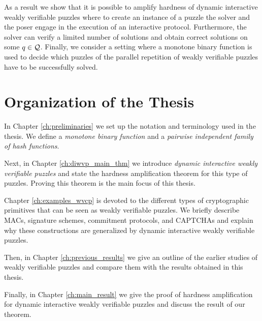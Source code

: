 As a result we show that it is possible to amplify hardness of dynamic interactive weakly verifiable puzzles where
to create an instance of a puzzle the solver and the poser engage in the execution of an interactive protocol.
Furthermore, the solver can verify a limited number of solutions and obtain correct solutions on some $q \in \mathcal{Q}$.
Finally, we consider a setting where a monotone binary function is used to decide which puzzles of the parallel repetition of weakly verifiable puzzles
have to be successfully solved.
%
\section{Organization of the Thesis}
In Chapter \ref{ch:preliminaries} we set up the notation and terminology used in the thesis.
We define a \textit{monotone binary function} and a \textit{pairwise independent family of hash functions}.

Next, in Chapter \ref{ch:diwvp_main_thm} we introduce \textit{dynamic interactive weakly verifiable
puzzles} and state the hardness amplification theorem for this type of puzzles.
Proving this theorem is the main focus of this thesis.

Chapter \ref{ch:examples_wvcp} is devoted to the different types of cryptographic primitives that
can be seen as weakly verifiable puzzles.
We briefly describe MACs, signature schemes, commitment protocols, and CAPTCHAs and explain why
these constructions are generalized by dynamic interactive weakly verifiable puzzles.

Then, in Chapter \ref{ch:previous_results} we give an outline of the earlier studies of weakly
verifiable puzzles and compare them with the results obtained in this thesis.

Finally, in Chapter \ref{ch:main_result} we give the proof of hardness amplification
for dynamic interactive weakly verifiable puzzles and discuss the result of our theorem.

